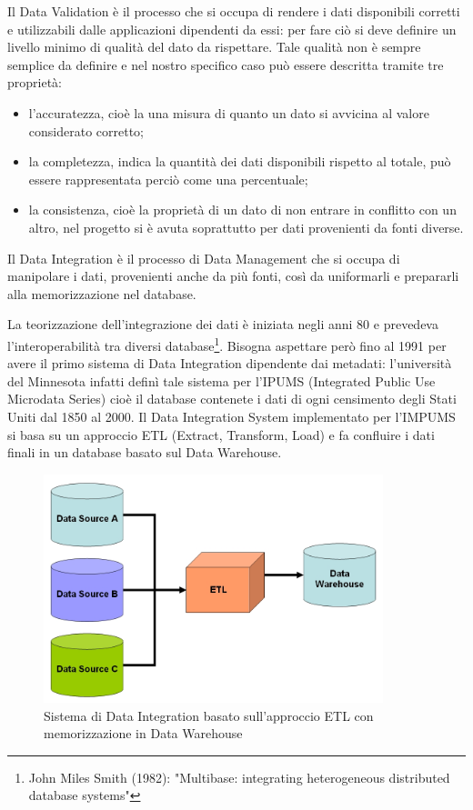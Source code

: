 \documentclass[12pt]{report}
\begin{document}
Il Data Validation è il processo che si occupa di rendere i dati disponibili corretti e utilizzabili dalle applicazioni dipendenti da essi: per fare ciò si deve definire un livello minimo di qualità del dato da rispettare. 
Tale qualità non è sempre semplice da definire e nel nostro specifico caso può essere descritta tramite tre proprietà:
\begin{itemize}
\item l'accuratezza, cioè la una misura di quanto un dato si avvicina al valore considerato corretto;
\item la completezza, indica la quantità dei dati disponibili rispetto al totale, può essere rappresentata perciò come una percentuale;
\item la consistenza, cioè la proprietà di un dato di non entrare in conflitto con un altro, nel progetto si è avuta soprattutto per dati provenienti da fonti diverse.
\end{itemize}

Il Data Integration è il processo di Data Management che si occupa di manipolare i dati, provenienti anche da più fonti, così da uniformarli e prepararli alla memorizzazione nel database.

La teorizzazione dell'integrazione dei dati è iniziata negli anni 80 e prevedeva l'interoperabilità tra diversi database\footnote{John Miles Smith (1982): "Multibase: integrating heterogeneous distributed database systems"}.
Bisogna aspettare però fino al 1991 per avere il primo sistema di Data Integration dipendente dai metadati: l'università del Minnesota infatti definì tale sistema per l'IPUMS (Integrated Public Use Microdata Series) cioè il database contenete i dati di ogni censimento degli Stati Uniti dal 1850 al 2000. 
Il Data Integration System implementato per l'IMPUMS si basa su un approccio ETL (Extract, Transform, Load) e fa confluire i dati finali in un database basato sul Data Warehouse.

\begin{figure}[H]
    \centering
    \includegraphics[width=280pt]{ETL+Datawarehouse.jpg}
    \caption{Sistema di Data Integration basato sull'approccio ETL con memorizzazione in Data Warehouse}
    \label{fig:ETL_Datawarehouse}
\end{figure}
\end{document}
